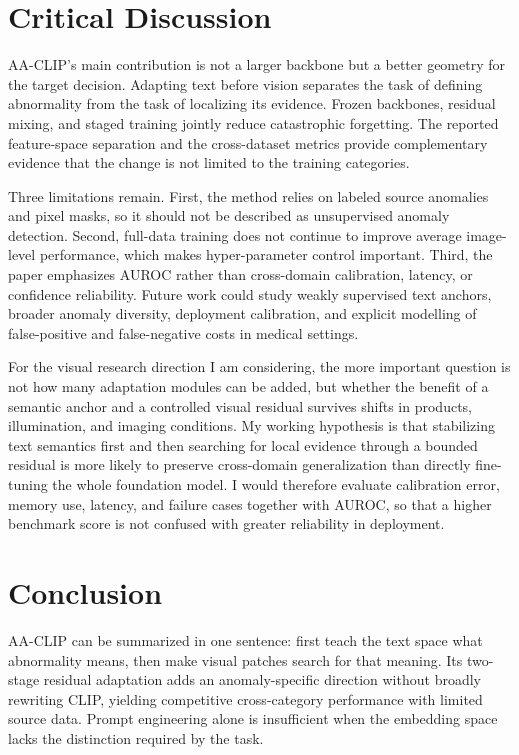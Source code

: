 \documentclass[a4paper,10pt]{article}
\begin{document}
\section{Critical Discussion}

AA-CLIP's main contribution is not a larger backbone but a better geometry for the target decision. Adapting text before vision separates the task of defining abnormality from the task of localizing its evidence. Frozen backbones, residual mixing, and staged training jointly reduce catastrophic forgetting. The reported feature-space separation and the cross-dataset metrics provide complementary evidence that the change is not limited to the training categories.

Three limitations remain. First, the method relies on labeled source anomalies and pixel masks, so it should not be described as unsupervised anomaly detection. Second, full-data training does not continue to improve average image-level performance, which makes hyper-parameter control important. Third, the paper emphasizes AUROC rather than cross-domain calibration, latency, or confidence reliability. Future work could study weakly supervised text anchors, broader anomaly diversity, deployment calibration, and explicit modelling of false-positive and false-negative costs in medical settings.

For the visual research direction I am considering, the more important question is not how many adaptation modules can be added, but whether the benefit of a semantic anchor and a controlled visual residual survives shifts in products, illumination, and imaging conditions. My working hypothesis is that stabilizing text semantics first and then searching for local evidence through a bounded residual is more likely to preserve cross-domain generalization than directly fine-tuning the whole foundation model. I would therefore evaluate calibration error, memory use, latency, and failure cases together with AUROC, so that a higher benchmark score is not confused with greater reliability in deployment.

\section{Conclusion}

AA-CLIP can be summarized in one sentence: first teach the text space what abnormality means, then make visual patches search for that meaning. Its two-stage residual adaptation adds an anomaly-specific direction without broadly rewriting CLIP, yielding competitive cross-category performance with limited source data. Prompt engineering alone is insufficient when the embedding space lacks the distinction required by the task.
\end{document}
